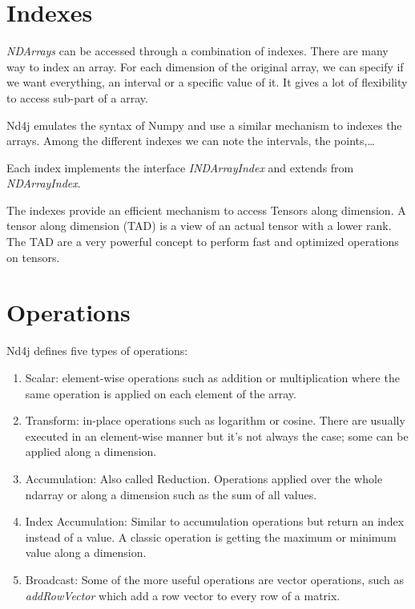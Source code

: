 \section{Indexes}

\textit{NDArrays} can be accessed through a combination of indexes. There are many way to index an array. For each dimension of the original array, we can specify if we want everything, an interval or a specific value of it. It gives a lot of flexibility to access sub-part of a array. 

Nd4j emulates the  syntax of Numpy\cite{numpy} and use a similar mechanism to indexes the arrays. Among the different indexes we can note the intervals, the points,\dots

Each index implements the interface \textit{INDArrayIndex} and extends from \textit{NDArrayIndex}.

The indexes provide an efficient mechanism to access Tensors along dimension. A tensor along dimension (TAD) is a view of an actual tensor with a lower rank. The TAD are a very powerful concept to perform fast and optimized operations on tensors.

\section{Operations}

Nd4j defines five types of operations:
\begin{enumerate}
\item Scalar: element-wise operations such as addition or multiplication where the same operation is applied on each element of the array. 
\item Transform: in-place operations such as logarithm or cosine. There are usually executed in an element-wise manner but it's not always the case; some can be applied along a dimension.
\item Accumulation: Also called Reduction. Operations applied over the whole ndarray or along a dimension such as the sum of all values.
\item Index Accumulation: Similar to accumulation operations but return an index instead of a value. A classic operation is getting the maximum or minimum value along a dimension.
\item Broadcast: Some of the more useful operations are vector operations, such as \textit{addRowVector} which add a row vector to every row of a matrix.
\end{enumerate}
